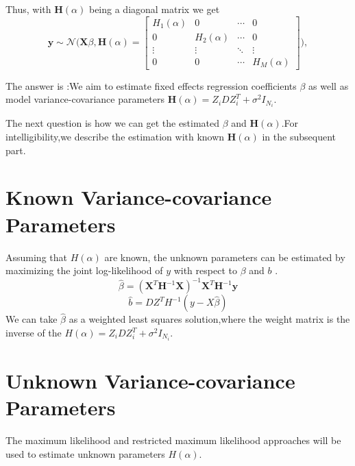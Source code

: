 \documentclass[12pt]{article}
\begin{document}
Thus, with $\bm{H}(\alpha)$ being a diagonal matrix we get \begin{equation}
	\bm{y}\sim\mathcal{N}\biggl( \bm{X}\beta,\bm{H}(\alpha)= \left[ \begin{array}{cccc}
	H_1(\alpha) & 0 & \cdots & 0 \\
	0 & H_2(\alpha)& \cdots& 0 \\
	\vdots & \vdots & \ddots& \vdots\\
	0 & 0& \cdots & H_M(\alpha) \end{array} \right] \biggr),	
\end{equation}

The answer is :We aim to estimate fixed effects regression coefficients $\beta$ as well as model variance-covariance parameters $\bm{H}(\alpha) = Z_iDZ_i^T + \sigma^2I_{N_i} $.

The next question is how we can get the estimated $\beta$ and $\bm{H}(\alpha)$.For intelligibility,we describe the estimation with known $\bm{H}(\alpha)$ in the subsequent part.

\section{Known Variance-covariance Parameters}
Assuming that $H(\alpha)$ are known, the unknown parameters can be estimated by maximizing the joint log-likelihood of $y$ with respect to $\beta$ and $b$ .
\begin{equation}
\widehat {\beta}=(\bm{X}^T\bm{H}^{-1}\bm{X})^{-1}\bm{X}^T\bm{H}^{-1}\bm{y}
\end{equation}
\begin{equation}
\widehat{b}= DZ^TH^{-1}(y-X\widehat{\beta})
\end{equation}
We can take $\widehat{\beta}$ as a weighted least squares solution,where the weight matrix is the inverse of the $H(\alpha) = Z_iDZ_i^T + \sigma^2I_{N_i}$.

\section{Unknown Variance-covariance Parameters}

The maximum likelihood and restricted maximum likelihood approaches will be used to estimate unknown parameters $H(\alpha)$.
\end{document}
